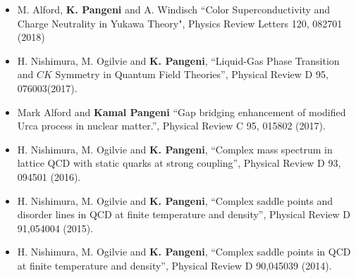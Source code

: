 \documentclass[10pt,letterpaper]{article}
\begin{document}
\begin{itemize}
\item  M. Alford, \textbf{K. Pangeni} and A. Windisch ``Color Superconductivity and Charge Neutrality in Yukawa Theory", Physics Review Letters 120, 082701 (2018)
 \item H. Nishimura, M. Ogilvie and \textbf{K. Pangeni}, ``Liquid-Gas Phase Transition and $CK$ Symmetry in Quantum Field Theories'', Physical Review D 95, 076003(2017).
\item  Mark Alford and \textbf{Kamal Pangeni} ``Gap bridging enhancement of modified Urca process in nuclear matter.'', Physical Review C 95, 015802 (2017).
 \item H. Nishimura, M. Ogilvie and \textbf{K. Pangeni}, ``Complex mass spectrum in lattice QCD with static quarks at strong coupling'', Physical Review D 93, 094501 (2016).
 \item  H. Nishimura, M. Ogilvie and \textbf{K. Pangeni}, ``Complex saddle points and disorder lines in QCD at finite temperature and density'', Physical Review D 91,054004 (2015). 
 \item H. Nishimura, M. Ogilvie and \textbf{K. Pangeni}, ``Complex saddle points in QCD at finite temperature and density'', Physical Review D 90,045039 (2014). 
 \end{itemize}
\end{document}

